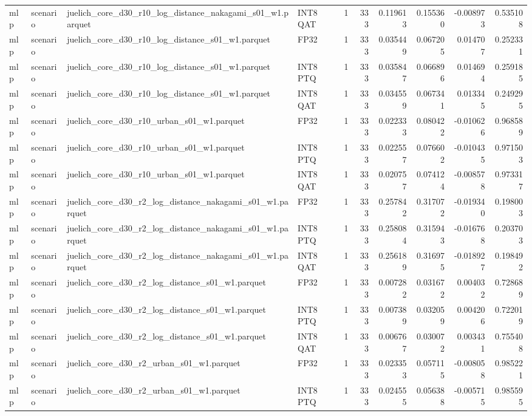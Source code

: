\begin{tabular}{llllrrrrrr}
mlp & scenario & juelich\_core\_d30\_r10\_log\_distance\_nakagami\_s01\_w1.parquet & INT8 QAT & 1 & 333 & 0.119613 & 0.155360 & -0.008973 & 0.535108 \\
mlp & scenario & juelich\_core\_d30\_r10\_log\_distance\_s01\_w1.parquet & FP32 & 1 & 333 & 0.035449 & 0.067205 & 0.014707 & 0.252331 \\
mlp & scenario & juelich\_core\_d30\_r10\_log\_distance\_s01\_w1.parquet & INT8 PTQ & 1 & 333 & 0.035847 & 0.066896 & 0.014694 & 0.259185 \\
mlp & scenario & juelich\_core\_d30\_r10\_log\_distance\_s01\_w1.parquet & INT8 QAT & 1 & 333 & 0.034559 & 0.067341 & 0.013345 & 0.249295 \\
mlp & scenario & juelich\_core\_d30\_r10\_urban\_s01\_w1.parquet & FP32 & 1 & 333 & 0.022333 & 0.080422 & -0.010626 & 0.968589 \\
mlp & scenario & juelich\_core\_d30\_r10\_urban\_s01\_w1.parquet & INT8 PTQ & 1 & 333 & 0.022557 & 0.076602 & -0.010435 & 0.971503 \\
mlp & scenario & juelich\_core\_d30\_r10\_urban\_s01\_w1.parquet & INT8 QAT & 1 & 333 & 0.020757 & 0.074124 & -0.008578 & 0.973317 \\
mlp & scenario & juelich\_core\_d30\_r2\_log\_distance\_nakagami\_s01\_w1.parquet & FP32 & 1 & 333 & 0.257842 & 0.317072 & -0.019340 & 0.198003 \\
mlp & scenario & juelich\_core\_d30\_r2\_log\_distance\_nakagami\_s01\_w1.parquet & INT8 PTQ & 1 & 333 & 0.258084 & 0.315943 & -0.016768 & 0.203703 \\
mlp & scenario & juelich\_core\_d30\_r2\_log\_distance\_nakagami\_s01\_w1.parquet & INT8 QAT & 1 & 333 & 0.256189 & 0.316975 & -0.018927 & 0.198492 \\
mlp & scenario & juelich\_core\_d30\_r2\_log\_distance\_s01\_w1.parquet & FP32 & 1 & 333 & 0.007282 & 0.031672 & 0.004032 & 0.728689 \\
mlp & scenario & juelich\_core\_d30\_r2\_log\_distance\_s01\_w1.parquet & INT8 PTQ & 1 & 333 & 0.007389 & 0.032059 & 0.004206 & 0.722019 \\
mlp & scenario & juelich\_core\_d30\_r2\_log\_distance\_s01\_w1.parquet & INT8 QAT & 1 & 333 & 0.006767 & 0.030072 & 0.003431 & 0.755408 \\
mlp & scenario & juelich\_core\_d30\_r2\_urban\_s01\_w1.parquet & FP32 & 1 & 333 & 0.023353 & 0.057115 & -0.008058 & 0.985221 \\
mlp & scenario & juelich\_core\_d30\_r2\_urban\_s01\_w1.parquet & INT8 PTQ & 1 & 333 & 0.024555 & 0.056388 & -0.005715 & 0.985595 \\

\end{tabular}
